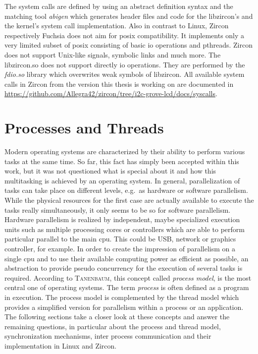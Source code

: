 The system calls are defined by using an abstract definition syntax and the matching tool \textit{abigen} which generates header files and code for the libzircon's and the kernel's system call implementation\cite{zircon-concepts}.
Also in contrast to Linux, Zircon respectively Fuchsia does not aim for \ac{posix} compatibility.
It implements only a very limited subset of \ac{posix} consisting of basic \ac{io} operations and pthreads.
Zircon does not support Unix-like signals, symbolic links and much more\cite{zircon-libc-posix}.
The libzircon.so does not support directly \ac{io} operations. 
They are performed by the \textit{fdio.so} library which overwrites weak symbols of libzircon\cite{zircon-libc-posix}.
All available system calls in Zircon from the version this thesis is working on are documented in \url{https://github.com/Allegra42/zircon/tree/i2c-grove-lcd/docs/syscalls}. 

\section{Processes and Threads}\label{sec:processes-threads}

Modern operating systems are characterized by their ability to perform various tasks at the same time.
So far, this fact has simply been accepted within this work, but it was not questioned what is special about it and how this multitasking is achieved by an operating system.
In general, parallelization of tasks can take place on different levels, e.g.\ as hardware or software parallelism.
While the physical resources for the first case are actually available to execute the tasks really simultaneously, it only seems to be so for software parallelism\cite{glatz2015betriebssysteme}.
Hardware parallelism is realized by independent, maybe specialized execution units such as multiple processing cores or controllers which are able to perform particular parallel to the main \ac{cpu}.
This could be USB, network or graphics controller, for example\cite{glatz2015betriebssysteme}.
In order to create the impression of parallelism on a single \ac{cpu} and to use their available computing power as efficient as possible, an abstraction to provide pseudo concurrency for the execution of several tasks is required.
According to \textsc{Tanenbaum}, this concept called \textit{process model}, is the most central one of operating systems\cite{tanenbaum-modern-operating-systems}.
The term \textit{process} is often defined as a program in execution\cite{achilles2006betriebssysteme}.
The process model is complemented by the thread model which provides a simplified version for parallelism within a process or an application\cite{glatz2015betriebssysteme}.
The following sections take a closer look at these concepts and answer the remaining questions, in particular about the process and thread model, synchronization mechanisms, inter process communication and their implementation in Linux and Zircon.


